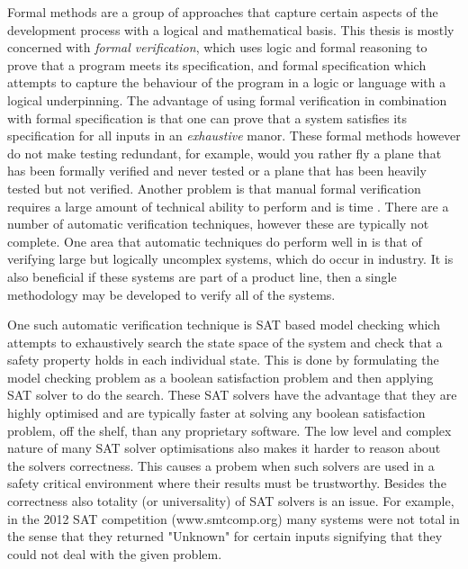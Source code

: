 Formal methods are a group of approaches that capture certain aspects of the development process with a logical and mathematical basis. This thesis is mostly concerned with \emph{formal verification}, which uses logic and formal reasoning to prove that a program meets its specification, and formal specification which attempts to capture the behaviour of the program in a logic or language with a logical underpinning. The advantage of using formal verification in combination with formal specification is that one can prove that a system satisfies its specification for all inputs in an \emph{exhaustive} manor. These formal methods however do not make testing redundant, for example, would you rather fly a plane that has been formally verified and never tested or a plane that has been heavily tested but not verified. Another problem is that manual formal verification requires a large amount of technical ability to perform and is time . There are a number of automatic verification techniques, however these are typically not complete. One area that automatic techniques do perform well in is that of verifying large but logically uncomplex systems, which do occur in industry. It is also beneficial if these systems are part of a product line, then a single methodology may be developed to verify all of the systems. 

One such automatic verification technique is SAT based model checking which attempts to exhaustively search the state space of the system and check that a safety property holds in each individual state. This is done by formulating the model checking problem as a boolean satisfaction problem and then applying SAT solver to do the search. These SAT solvers have the advantage that they are highly optimised and are typically faster at solving any boolean satisfaction problem, off the shelf, than any proprietary software. The low level and complex nature of many SAT solver optimisations also makes it harder to reason about the solvers correctness. This causes a probem when such solvers are used in a safety critical environment where their results must be trustworthy. Besides the correctness also
totality (or universality) of SAT solvers is an issue. For example, in the 2012 SAT competition (www.smtcomp.org) many systems were not total in the sense that they returned
"Unknown" for certain inputs signifying that they could not deal with the given problem. 

